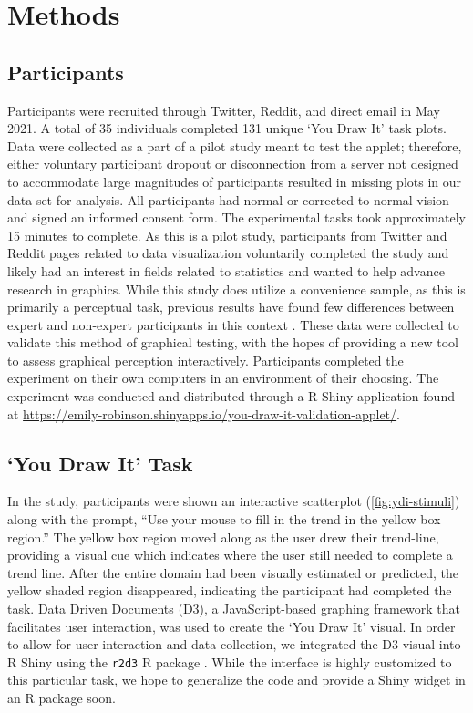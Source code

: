 \documentclass[12pt]{article}
\begin{document}
\hypertarget{methods}{%
\section{Methods}\label{methods}}

\hypertarget{participants}{%
\subsection{Participants}\label{participants}}

Participants were recruited through Twitter, Reddit, and direct email in
May 2021. A total of 35 individuals completed 131 unique `You Draw It'
task plots. Data were collected as a part of a pilot study meant to test
the applet; therefore, either voluntary participant dropout or
disconnection from a server not designed to accommodate large magnitudes
of participants resulted in missing plots in our data set for analysis.
All participants had normal or corrected to normal vision and signed an
informed consent form. The experimental tasks took approximately 15
minutes to complete. As this is a pilot study, participants from Twitter
and Reddit pages related to data visualization voluntarily completed the
study and likely had an interest in fields related to statistics and
wanted to help advance research in graphics. While this study does
utilize a convenience sample, as this is primarily a perceptual task,
previous results have found few differences between expert and
non-expert participants in this context \citep{vanderplas2015spatial}.
These data were collected to validate this method of graphical testing,
with the hopes of providing a new tool to assess graphical perception
interactively. Participants completed the experiment on their own
computers in an environment of their choosing. The experiment was
conducted and distributed through a R Shiny application \citep{shinyPkg}
found at
\url{https://emily-robinson.shinyapps.io/you-draw-it-validation-applet/}.

\hypertarget{you-draw-it-task}{%
\subsection{`You Draw It' Task}\label{you-draw-it-task}}

In the study, participants were shown an interactive scatterplot
(\cref{fig:ydi-stimuli}) along with the prompt, ``Use your mouse to fill
in the trend in the yellow box region.'' The yellow box region moved
along as the user drew their trend-line, providing a visual cue which
indicates where the user still needed to complete a trend line. After
the entire domain had been visually estimated or predicted, the yellow
shaded region disappeared, indicating the participant had completed the
task. Data Driven Documents (D3), a JavaScript-based graphing framework
that facilitates user interaction, was used to create the `You Draw It'
visual. In order to allow for user interaction and data collection, we
integrated the D3 visual into R Shiny using the \texttt{r2d3} R package
\citep{r2d3}. While the interface is highly customized to this
particular task, we hope to generalize the code and provide a Shiny
widget in an R package soon.
\end{document}
